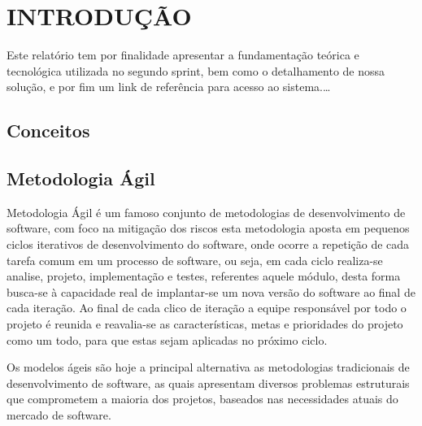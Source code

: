 \documentclass{abnt}
\begin{document}





\capa

\folhaderosto

\tableofcontents


\chapter{INTRODUÇÃO}

	Este relatório tem por finalidade apresentar a fundamentação teórica e tecnológica utilizada no segundo sprint, bem como o detalhamento de nossa solução, e por fim um link de referência para acesso ao sistema.\ldots


	\section{Conceitos}
	
	\section{Metodologia Ágil}
	
		Metodologia Ágil é um famoso conjunto de metodologias de desenvolvimento de software, 
		com foco na mitigação dos riscos esta metodologia aposta em pequenos ciclos iterativos de desenvolvimento do software,
		onde ocorre a repetição de cada tarefa comum em um processo de software, ou seja, em cada ciclo realiza-se analise, projeto,
		implementação e testes, referentes aquele módulo, desta forma busca-se à capacidade real de implantar-se um nova versão 
		do software ao final de cada iteração. Ao final de cada clico de iteração a equipe responsável por todo o projeto é reunida 
		e reavalia-se as características, metas e prioridades do projeto como um todo, para que estas sejam aplicadas no próximo ciclo.
		
		Os modelos ágeis são hoje a principal alternativa as metodologias tradicionais de desenvolvimento de software, 
		as quais apresentam diversos problemas estruturais que comprometem a maioria dos projetos, 
		baseados nas necessidades atuais do mercado de software.
	
\end{document}
